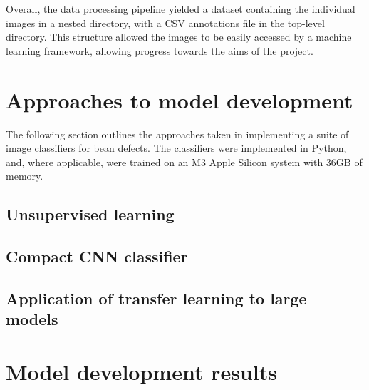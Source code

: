 Overall, the data processing pipeline yielded a dataset containing the individual images in a nested directory, with
a CSV annotations file in the top-level directory.
This structure allowed the images to be easily accessed by a machine learning framework, allowing progress towards the
aims of the project.


\section{Approaches to model development}
\label{sec:approaches-to-model-development}
The following section outlines the approaches taken in implementing a suite of image classifiers for bean defects.
The classifiers were implemented in Python, and, where applicable, were trained on an M3 Apple Silicon system with 36GB
of memory.
\subsection{Unsupervised learning}
\label{subsec:knn-classifier}

\subsection{Compact CNN classifier}
\label{subsec:deep-learning}

\subsection{Application of transfer learning to large models}
\label{subsec:transfer-learning}

\section{Model development results}
\label{sec:model-development-results}